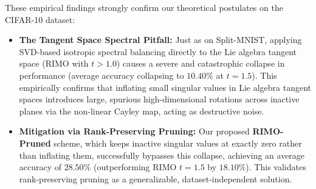 These empirical findings strongly confirm our theoretical postulates on the CIFAR-10 dataset:
\begin{itemize}
    \item \textbf{The Tangent Space Spectral Pitfall:} Just as on Split-MNIST, applying SVD-based isotropic spectral balancing directly to the Lie algebra tangent space (RIMO with $t > 1.0$) causes a severe and catastrophic collapse in performance (average accuracy collapsing to $10.40\%$ at $t=1.5$). This empirically confirms that inflating small singular values in Lie algebra tangent spaces introduces large, spurious high-dimensional rotations across inactive planes via the non-linear Cayley map, acting as destructive noise.
    \item \textbf{Mitigation via Rank-Preserving Pruning:} Our proposed \textbf{RIMO-Pruned} scheme, which keeps inactive singular values at exactly zero rather than inflating them, successfully bypasses this collapse, achieving an average accuracy of $28.50\%$ (outperforming RIMO $t=1.5$ by $18.10\%$). This validates rank-preserving pruning as a generalizable, dataset-independent solution.
\end{itemize}


